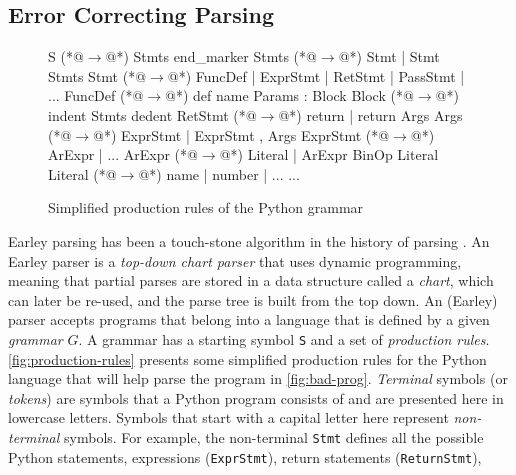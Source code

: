\subsection{Error Correcting Parsing}
\label{sec:overview:ec-parsing}

\begin{figure}[t]
\begin{ecode}
S        (*@$\rightarrow$@*) Stmts end_marker
Stmts    (*@$\rightarrow$@*) Stmt \n | Stmt \n Stmts
Stmt     (*@$\rightarrow$@*) FuncDef | ExprStmt | RetStmt | PassStmt | ...
FuncDef  (*@$\rightarrow$@*) def name Params : Block
Block    (*@$\rightarrow$@*) \n indent Stmts dedent
RetStmt  (*@$\rightarrow$@*) return | return Args
Args     (*@$\rightarrow$@*) ExprStmt | ExprStmt , Args
ExprStmt (*@$\rightarrow$@*) ArExpr | ...
ArExpr   (*@$\rightarrow$@*) Literal | ArExpr BinOp Literal
Literal  (*@$\rightarrow$@*) name | number | ...
...
\end{ecode}
\caption{Simplified production rules of the Python grammar}
\label{fig:production-rules}
\end{figure}

 Earley parsing has been a touch-stone
algorithm in the history of parsing \citep{Earley_1970}. An Earley parser is a
\emph{top-down chart parser} that uses dynamic programming, meaning that partial
parses are stored in a data structure called a \emph{chart}, which can later be
re-used, and the parse tree is built from the top down. An (Earley) parser
accepts programs that belong into a language that is defined by a given
\emph{grammar} $G$. A grammar has a starting symbol \texttt{S} and a set of
\emph{production rules}. \autoref{fig:production-rules} presents some simplified
production rules for the Python language that will help parse the program in
\autoref{fig:bad-prog}. \emph{Terminal} symbols (or \emph{tokens}) are symbols
that a Python program consists of and are presented here in lowercase letters.
Symbols that start with a capital letter here represent \emph{non-terminal}
symbols. For example, the non-terminal \texttt{Stmt} defines all the possible
Python statements, \ie expressions (\texttt{ExprStmt}), return statements
(\texttt{ReturnStmt}), \etc




